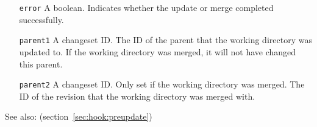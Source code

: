 \begin{itemize}
\item[\texttt{error}] A boolean.  Indicates whether the update or
  merge completed successfully.
\item[\texttt{parent1}] A changeset ID.  The ID of the parent that the
  working directory was updated to.  If the working directory was
  merged, it will not have changed this parent.
\item[\texttt{parent2}] A changeset ID.  Only set if the working
  directory was merged.  The ID of the revision that the working
  directory was merged with.
\end{itemize}

See also:  (section~\ref{sec:hook:preupdate})

